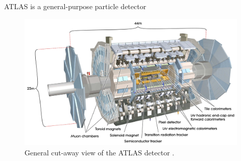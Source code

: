 ﻿ATLAS is a general-purpose particle detector


\begin{figure}[tbp]
  \begin{center}
    \includegraphics[width=0.98\textwidth]{figs/detector/atlas.pdf}
  \end{center}
  \caption[General cut-away view of the ATLAS detector.]
          {General cut-away view of the ATLAS detector \cite{PERF-2007-01}.}
\end{figure}
